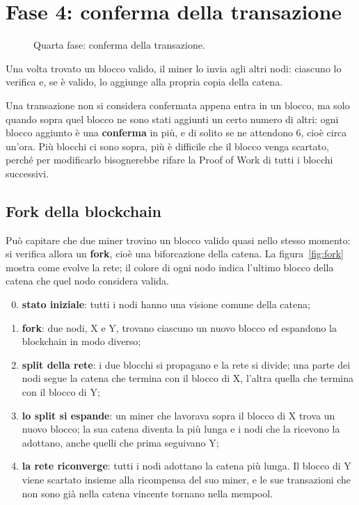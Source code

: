 \documentclass[a4paper, 11pt, oneside]{book}
\begin{document}
	\section{Fase 4: conferma della transazione}
	\begin{figure}[H]
		\centering
		\caption{Quarta fase: conferma della transazione.}
		\label{fig:ciclo-vita-fase4}
	\end{figure}

	Una volta trovato un blocco valido, il miner lo invia agli altri nodi: ciascuno lo
	verifica e, se è valido, lo aggiunge alla propria copia della catena.

	Una transazione non si considera confermata appena entra in un blocco, ma solo quando
	sopra quel blocco ne sono stati aggiunti un certo numero di altri: ogni blocco
	aggiunto è una \textbf{conferma} in più, e di solito se ne attendono 6, cioè circa
	un'ora. Più blocchi ci sono sopra, più è difficile che il blocco venga scartato,
	perché per modificarlo bisognerebbe rifare la Proof of Work di tutti i blocchi
	successivi.

	\subsection{Fork della blockchain}\label{sec:fork}
	Può capitare che due miner trovino un blocco valido quasi nello stesso momento: si
	verifica allora un \textbf{fork}, cioè una biforcazione della catena. La
	figura~\ref{fig:fork} mostra come evolve la rete; il colore di ogni nodo indica
	l'ultimo blocco della catena che quel nodo considera valida.
	\begin{enumerate}
		\setcounter{enumi}{-1}
		\item \textbf{stato iniziale}: tutti i nodi hanno una visione comune della catena;
		\item \textbf{fork}: due nodi, X e Y, trovano ciascuno un nuovo blocco ed
			espandono la blockchain in modo diverso;
		\item \textbf{split della rete}: i due blocchi si propagano e la rete si divide;
			una parte dei nodi segue la catena che termina con il blocco di X, l'altra
			quella che termina con il blocco di Y;
		\item \textbf{lo split si espande}: un miner che lavorava sopra il blocco di X
			trova un nuovo blocco; la sua catena diventa la più lunga e i nodi che la
			ricevono la adottano, anche quelli che prima seguivano Y;
		\item \textbf{la rete riconverge}: tutti i nodi adottano la catena più lunga. Il
			blocco di Y viene scartato insieme alla ricompensa del suo miner, e le sue
			transazioni che non sono già nella catena vincente tornano nella mempool.
	\end{enumerate}
\end{document}
